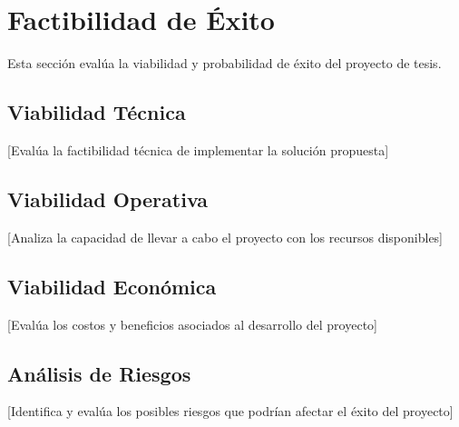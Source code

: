 \section{Factibilidad de Éxito}

Esta sección evalúa la viabilidad y probabilidad de éxito del proyecto de tesis.

\subsection{Viabilidad Técnica}
[Evalúa la factibilidad técnica de implementar la solución propuesta]

\subsection{Viabilidad Operativa}
[Analiza la capacidad de llevar a cabo el proyecto con los recursos disponibles]

\subsection{Viabilidad Económica}
[Evalúa los costos y beneficios asociados al desarrollo del proyecto]

\subsection{Análisis de Riesgos}
[Identifica y evalúa los posibles riesgos que podrían afectar el éxito del proyecto]
